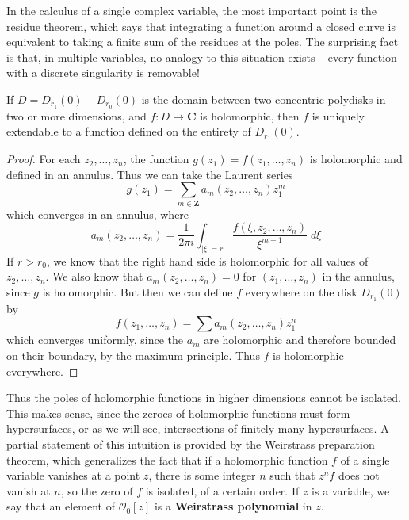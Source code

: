 In the calculus of a single complex variable, the most important point is the residue theorem, which says that integrating a function around a closed curve is equivalent to taking a finite sum of the residues at the poles. The surprising fact is that, in multiple variables, no analogy to this situation exists -- every function with a discrete singularity is removable!

\begin{theorem}
    If $D = D_{r_1}(0) - D_{r_0}(0)$ is the domain between two concentric polydisks in two or more dimensions, and $f: D \to \mathbf{C}$ is holomorphic, then $f$ is uniquely extendable to a function defined on the entirety of $D_{r_1}(0)$.
\end{theorem}
\begin{proof}
    For each $z_2, \dots, z_n$, the function $g(z_1) = f(z_1, \dots, z_n)$ is holomorphic and defined in an annulus. Thus we can take the Laurent series
    \[ g(z_1) = \sum_{m \in \mathbf{Z}} a_m(z_2, \dots, z_n) z_1^m \]
    which converges in an annulus, where
    \[ a_m(z_2, \dots, z_n) = \frac{1}{2 \pi i} \int_{|\xi| = r} \frac{f(\xi, z_2, \dots, z_n)}{\xi^{m+1}}\; d\xi \]
    If $r > r_0$, we know that the right hand side is holomorphic for all values of $z_2, \dots, z_n$. We also know that $a_m(z_2, \dots, z_n) = 0$ for $(z_1, \dots, z_n)$ in the annulus, since $g$ is holomorphic. But then we can define $f$ everywhere on the disk $D_{r_1}(0)$ by
    \[ f(z_1, \dots, z_n) = \sum a_m(z_2, \dots, z_n) z_1^n \]
    which converges uniformly, since the $a_m$ are holomorphic and therefore bounded on their boundary, by the maximum principle. Thus $f$ is holomorphic everywhere.
\end{proof}

Thus the poles of holomorphic functions in higher dimensions cannot be isolated. This makes sense, since the zeroes of holomorphic functions must form hypersurfaces, or as we will see, intersections of finitely many hypersurfaces. A partial statement of this intuition is provided by the Weirstrass preparation theorem, which generalizes the fact that if a holomorphic function $f$ of a single variable vanishes at a point $z$, there is some integer $n$ such that $z^n f$ does not vanish at $n$, so the zero of $f$ is isolated, of a certain order. If $z$ is a variable, we say that an element of $\mathcal{O}_0[z]$ is a {\bf Weirstrass polynomial} in $z$. 









